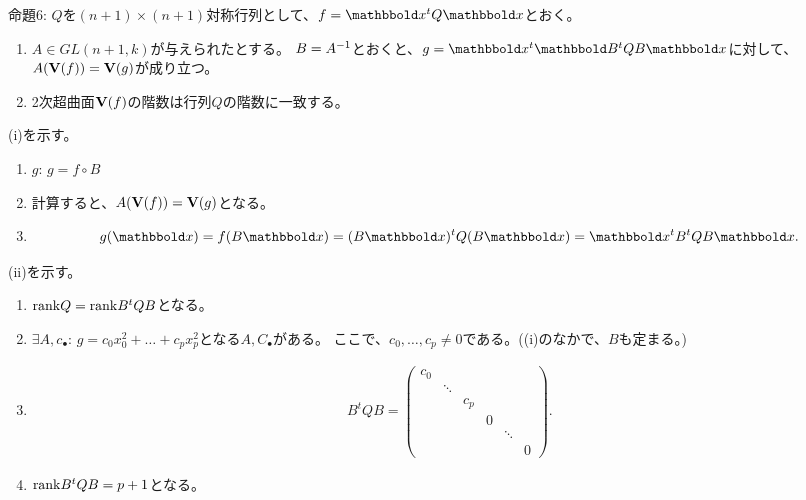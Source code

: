 \begin{framed}
  命題6:
  $Q$を$(n+1)\times (n+1)$対称行列として、$f=\bbold x^t Q \bbold x$とおく。
  \begin{enumerate}[label=(\roman*)]
    \item $A\in GL(n+1,k)$が与えられたとする。
    $B=A^{-1}{} $とおくと、$g=\bbold x^t \bbold B^t Q B \bbold x$に対して、
    $A(\textbf V(f)) = \textbf V(g)$が成り立つ。
    \item
    2次超曲面$\textbf V(f)$の階数は行列$Q$の階数に一致する。
  \end{enumerate}
\end{framed}
\begin{myproof}
  (i)を示す。
  \begin{enumerate}
    \item $g$: $g=f\circ B$
    \item 計算すると、$A(\textbf V(f)) = \textbf V(g)$となる。
    \item
    \begin{align}
      g(\bbold x) =
      f(B\bbold x)
      =
      (B\bbold x)^t Q (B\bbold x)
      =
      \bbold x^t B^t Q B \bbold x.
    \end{align}

  \end{enumerate}

  (ii)を示す。
  \begin{enumerate}
    \item $\mathrm{rank} Q = \mathrm{rank} B^t QB$となる。
    \item $\exists A,c_\bullet$:
    $g=c_0 x_0^2 + \dots + c_p x_p^2$となる$A,C_\bullet$がある。
    ここで、$c_0,\dots,c_p \neq 0$である。((i)のなかで、$B$も定まる。)
    \item
    \begin{align}
      B^t Q B =
      \begin{pmatrix}
        c_0 & & & & & \\
        & \ddots & & & &\\
        & & c_p & & & \\
        & & & 0 & & \\
        & & & & \ddots & \\
        & & & & & 0
      \end{pmatrix}.
    \end{align}
    \item
    $\mathrm{rank} B^t Q  B = p+1$となる。
  \end{enumerate}
\end{myproof}

